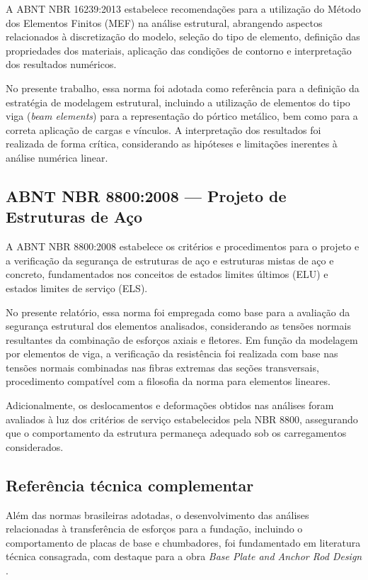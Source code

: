 \documentclass[12pt, a4paper]{article}
\begin{document}
A ABNT NBR 16239:2013 \cite{nbr16239} estabelece recomendações para a utilização do Método dos Elementos Finitos (MEF) na análise estrutural, abrangendo aspectos relacionados à discretização do modelo, seleção do tipo de elemento, definição das propriedades dos materiais, aplicação das condições de contorno e interpretação dos resultados numéricos.

No presente trabalho, essa norma foi adotada como referência para a definição da estratégia de modelagem estrutural, incluindo a utilização de elementos do tipo viga (\textit{beam elements}) para a representação do pórtico metálico, bem como para a correta aplicação de cargas e vínculos. A interpretação dos resultados foi realizada de forma crítica, considerando as hipóteses e limitações inerentes à análise numérica linear.

\subsection{ABNT NBR 8800:2008 — Projeto de Estruturas de Aço}

A ABNT NBR 8800:2008 \cite{nbr8800} estabelece os critérios e procedimentos para o projeto e a verificação da segurança de estruturas de aço e estruturas mistas de aço e concreto, fundamentados nos conceitos de estados limites últimos (ELU) e estados limites de serviço (ELS).

No presente relatório, essa norma foi empregada como base para a avaliação da segurança estrutural dos elementos analisados, considerando as tensões normais resultantes da combinação de esforços axiais e fletores. Em função da modelagem por elementos de viga, a verificação da resistência foi realizada com base nas tensões normais combinadas nas fibras extremas das seções transversais, procedimento compatível com a filosofia da norma para elementos lineares.

Adicionalmente, os deslocamentos e deformações obtidos nas análises foram avaliados à luz dos critérios de serviço estabelecidos pela NBR 8800, assegurando que o comportamento da estrutura permaneça adequado sob os carregamentos considerados.

\subsection{Referência técnica complementar}

Além das normas brasileiras adotadas, o desenvolvimento das análises relacionadas à transferência de esforços para a fundação, incluindo o comportamento de placas de base e chumbadores, foi fundamentado em literatura técnica consagrada, com destaque para a obra \textit{Base Plate and Anchor Rod Design} \cite{aisc_dg1}.
\end{document}
